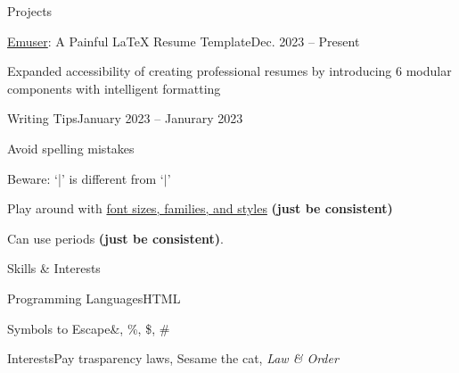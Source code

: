 \documentclass[10pt]{extarticle} %
\begin{document}
\begin{sectionList}{Projects}
    \item \lr
    {\href{https://github.com/quinnouyang/emuser}{Emuser}: A Painful LaTeX Resume Template}{Dec. 2023 -- Present}
    \begin{nobullets}
        \item Expanded accessibility of creating professional resumes by introducing 6 modular components with intelligent formatting
    \end{nobullets}

    \item \lr
    {Writing Tips}{January 2023 -- Janurary 2023}
    \begin{bullets}
        \item Avoid spelling mistakes
        \item Beware: `|' is different from `$\vert$'
        \item Play around with \href{https://www.overleaf.com/learn/latex/Font_sizes%2C_families%2C_and_styles}{font sizes, families, and styles} \textbf{(just be consistent)}
        \item Can use periods \textbf{(just be consistent)}.
    \end{bullets}
\end{sectionList}

\begin{sectionList}{Skills \& Interests}
    \item \begin{nobullets}
        \item {}
        {Programming Languages}{HTML}
        \item {}
        {Symbols to Escape}{\&, \%, \$, \#}
        \item {}
        {Interests}{Pay trasparency laws, Sesame the cat, \textit{Law \& Order}}
    \end{nobullets}
\end{sectionList}

\dateFooter
\end{document}
